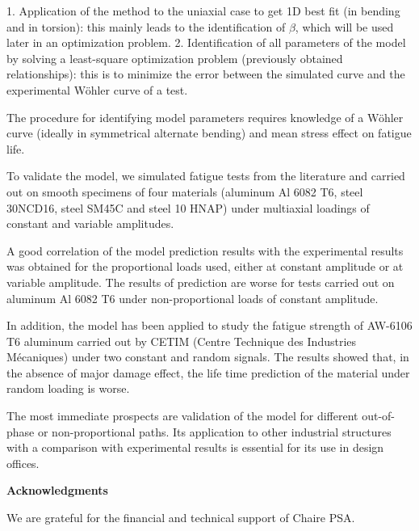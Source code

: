 1. Application of the method to the uniaxial case to get 1D best fit (in bending and in torsion): this mainly leads to the identification of $\beta$, which will be used later in an optimization problem.
2. Identification of all parameters of the model by solving a least-square optimization problem (previously obtained relationships): this is to minimize the error between the simulated curve and the experimental Wöhler curve of a test.

The procedure for identifying model parameters requires knowledge of a Wöhler curve (ideally in symmetrical alternate bending) and mean stress effect on fatigue life.

To validate the model, we simulated fatigue tests from the literature and carried out on smooth specimens of four materials (aluminum Al 6082 T6,  steel 30NCD16, steel SM45C and steel 10 HNAP) under multiaxial loadings of constant and variable amplitudes.

A good correlation of the model prediction results with the experimental results was obtained for the proportional loads used, either at constant amplitude or at variable amplitude. The results of prediction are worse for tests carried out on aluminum Al 6082 T6 under non-proportional loads of constant amplitude.

In addition, the model has been applied to study the fatigue strength of AW-6106 T6 aluminum carried out by CETIM (Centre Technique des Industries Mécaniques) under two constant and random signals. The results showed that, in the absence of major damage effect, the life time prediction of the material under random loading is worse. 

The most immediate prospects are validation of the model for different out-of-phase or non-proportional paths. Its application to other industrial structures with a comparison with experimental results is essential for its use in design offices.


\vspace{6pt}
\noindent
\textbf{Acknowledgments}

\vspace{6pt}
We are grateful for the financial and technical support of Chaire PSA.


